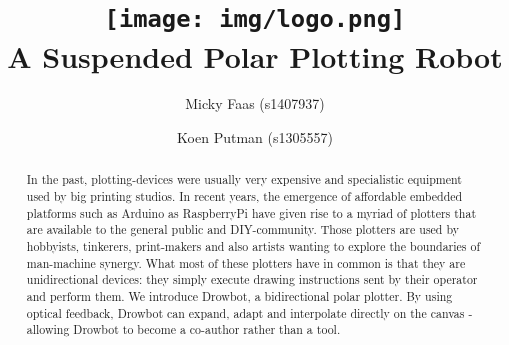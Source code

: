 \documentclass[12pt]{article}
\title{\vspace{-7em}
\texttt{[image: img/logo.png]} \\ \vspace{.5em}
\Large A Suspended Polar Plotting Robot}
\author{Micky Faas (s1407937) \and Koen Putman (s1305557)}
\date{}
\begin{document}
\maketitle
\begin{abstract}

In the past, plotting-devices were usually very expensive and specialistic equipment used by big printing studios. In recent years, the emergence of affordable embedded platforms such as Arduino as RaspberryPi have given rise to a myriad of plotters that are available to the general public and DIY-community. Those plotters are used by hobbyists, tinkerers, print-makers and also artists wanting to explore the boundaries of man-machine synergy. What most of these plotters have in common is that they are unidirectional devices: they simply execute drawing instructions sent by their operator and perform them. We introduce Drowbot, a bidirectional polar plotter. By using optical feedback, Drowbot can expand, adapt and interpolate directly on the canvas - allowing Drowbot to become a co-author rather than a tool.

\end{abstract}
\end{document}

